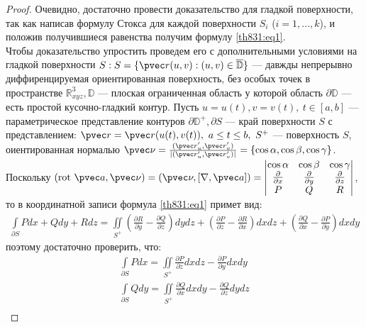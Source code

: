 \begin{proof}
  Очевидно, достаточно провести доказательство для гладкой поверхности, так как
  написав формулу Стокса для каждой поверхности $S_i$ ($i = 1, \dots, k$), и
  положив получившиеся равенства получим формулу \eqref{th831:eq1}. \\

  Чтобы доказательство упростить проведем его с дополнительными условиями на
  гладкой поверхности $S : S = \{\pvec r(u, v): (u, v) \in
  \overline{\mathbb{D}}\}$ --- давжды непрерывно диффиренцируемая
  ориентированная поверхность, без особых точек в пространстве
  $\mathbb{R}_{xyz}^3, \mathbb{D}$ --- плоская ограниченная область у которой
  область $\partial \mathbb{D}$ --- есть простой кусочно-гладкий контур. Пусть
  $u = u(t), v = v(t), \ t \in [a,b]$ --- параметрическое представление
  контуров $\partial {\mathbb{D}}^+, \partial S$ --- край поверхности $S$ с
  представлением: $\pvec r = \pvec r(u(t), v(t)), \ a \leq t \leq b, \ S^+$ ---
  поверхность $S$, оиентированная нормалью $\pvec \nu = \frac{(\pvec r_u',
  \pvec r_v')}{|(\pvec r_u', \pvec r_v')|} = \{\cos \alpha, \cos \beta, \cos
  \gamma\}$. \\
  Поскольку $(\mbox{rot} \ \pvec a, \pvec \nu) = (\pvec \nu, [\nabla, \pvec a])
  = \begin{vmatrix}
    \cos \alpha & \cos \beta & \cos \gamma \\
    \frac{\partial }{\partial x} & \frac{\partial }{\partial y} &
    \frac{\partial }{\partial z} \\
    P & Q & R
  \end{vmatrix}$, то в координатной записи формула \eqref{th831:eq1} примет
  вид:
  \begin{gather}
    \int\limits_{\partial S} Pdx + Qdy + Rdz = \iint\limits_{S^+}
    \left(\frac{\partial R}{\partial y} - \frac{\partial Q}{\partial z} \right)
    dy dz + \left(\frac{\partial P}{\partial z} - \frac{\partial R}{\partial x}
    \right) dx dz + \left(\frac{\partial Q}{\partial x} - \frac{\partial
    P}{\partial y} \right) dx dy
    \label{th831:eq2}
  \end{gather}
  поэтому достаточно проверить, что:
  \begin{gather*}
    \int\limits_{\partial S} Pdx = \iint\limits_{S^+} \frac{\partial
    P}{\partial z} dx dz - \frac{\partial P}{\partial y} dx dy \\
    \int\limits_{\partial S} Qdy = \iint\limits_{S^+} \frac{\partial
    Q}{\partial x} dx dy - \frac{\partial Q}{\partial z} dy dz \\

\end{gather*}
\end{proof}
